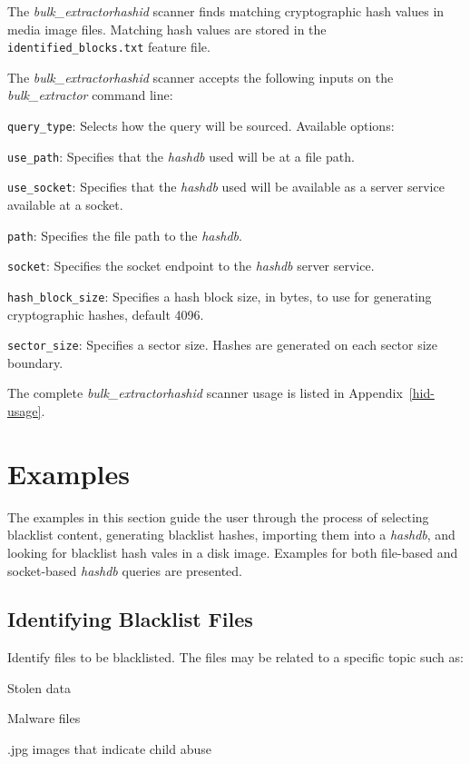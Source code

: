 \documentclass[11pt,twoside]{article}
\newcommand \bulk {\textit{bulk\_extractor}\xspace}
\newcommand \hdb {\textit{hashdb}\xspace}
\newcommand \hid {\textit{hashid}\xspace}
\begin{document}
The \bulk \hid scanner finds matching cryptographic hash values
in media image files.
Matching hash values are stored in the \texttt{identified\_blocks.txt}
feature file.

The \bulk \hid scanner accepts the following inputs
on the \bulk command line:

\begin{compactitem}	
\item \texttt{query\_type}: Selects how the query will be sourced.
Available options:
\begin{compactitem}	
\item \texttt{use\_path}: Specifies that the \hdb used will be at a file path.
\item \texttt{use\_socket}: Specifies that the \hdb used will be
available as a server service available at a socket.
\end{compactitem}	
\item \texttt{path}: Specifies the file path to the \hdb.
\item \texttt{socket}: Specifies the socket endpoint to the \hdb server service.
\item \texttt{hash\_block\_size}: Specifies a hash block size, in bytes,
to use for generating cryptographic hashes, default 4096.
\item \texttt{sector\_size}: Specifies a sector size.
Hashes are generated on each sector size boundary.
\end{compactitem}

The complete \bulk \hid scanner usage is listed in Appendix~\ref{hid-usage}.

\section{Examples}
The examples in this section guide the user through the process
of selecting blacklist content,
generating blacklist hashes,
importing them into a \hdb,
and looking for blacklist hash vales in a disk image.
Examples for both file-based and socket-based \hdb queries are presented.

\subsection{Identifying Blacklist Files}
Identify files to be blacklisted.
The files may be related to a specific topic such as:
\begin{compactitem}	
\item Stolen data
\item Malware files
\item .jpg images that indicate child abuse
\end{compactitem}	
\end{document}

